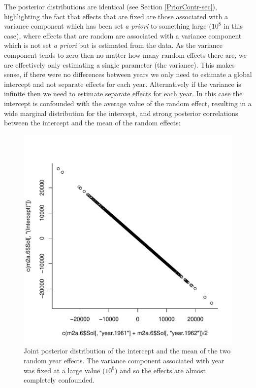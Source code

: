 \documentclass{article}
\begin{document}
The posterior distributions are identical (see Section \ref{PriorContr-sec}), highlighting the fact that effects that are fixed are those associated with a variance component which has been set \emph{a priori} to something large ($10^8$ in this case), where effects that are random are associated with a variance component which is not set \emph{a priori} but is estimated from the data. As the variance component tends to zero then no matter how many random effects there are, we are effectively only estimating a single parameter (the variance). This makes sense, if there were no differences between years we only need to estimate a global intercept and not separate effects for each year. Alternatively if the variance is infinite then we need to estimate separate effects for each year. In this case the intercept is confounded with the average value of the random effect, resulting in a wide marginal distribution for the intercept, and strong posterior correlations between the intercept and the mean of the random effects:

\begin{Schunk}
\end{Schunk}


\begin{figure}[!h]
\begin{center}
\includegraphics{Lecture2-052}
\end{center}
\caption{Joint posterior distribution of the intercept and the mean of the two random year effects. The variance component associated with year was fixed at a large value ($10^8$) and so the effects are almost completely confounded.}
\label{yfixed-fig}
\end{figure}
\end{document}

